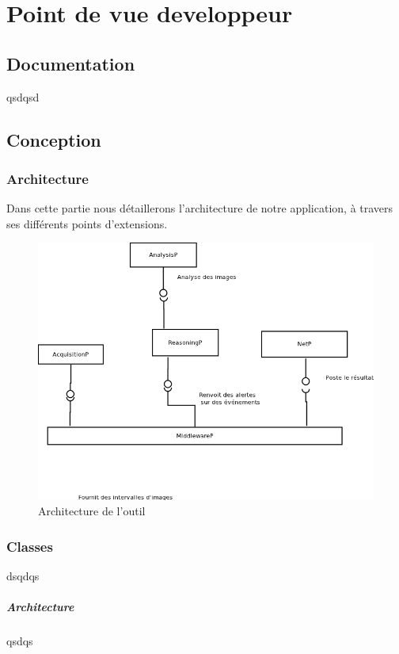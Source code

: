 \chapter{Point de vue developpeur}

\section{Documentation}
qsdqsd
\clearpage
\section{Conception}
\subsection{Architecture}
Dans cette partie nous détaillerons l'architecture de notre application, à travers ses différents points d'extensions.
\begin{figure}[!htbp]
  \centering
  \includegraphics[scale=0.50]{img/archi}
  \caption{Architecture de l'outil}
  \label{fig:archi}
\end{figure}

\subsection{Classes}
dsqdqs
\paragraph{Architecture}
qsdqs
